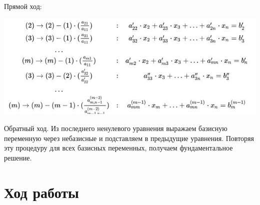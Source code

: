 \documentclass[12pt,a4paper]{scrartcl}
\begin{document}
Прямой ход:
\begin{center}
\includegraphics[width=0.7 \textwidth]{2.jpg}
\end{center}

Обратный ход. Из последнего ненулевого уравнения выражаем базисную переменную через небазисные и подставляем в предыдущие уравнения. Повторяя эту процедуру для всех базисных переменных, получаем фундаментальное решение.
\section{Ход работы}
\label{sec:exp}
\end{document}
